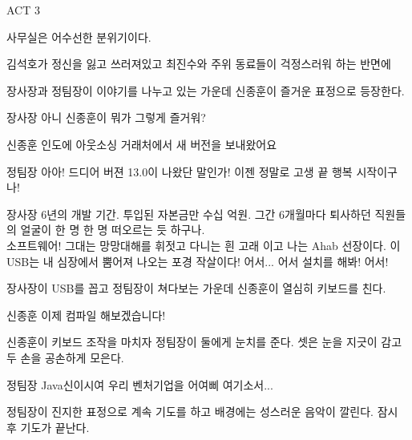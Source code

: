 \documentclass{screenplay}
\begin{document}
    \pagebreak
    
    ACT 3
    
    \fadein
    
    사무실은 어수선한 분위기이다.
    
    
    김석호가 정신을 잃고 쓰러져있고 최진수와 주위 동료들이 걱정스러워 하는 반면에 
    
    
    장사장과 정팀장이 이야기를 나누고 있는 가운데 신종훈이 즐거운 표정으로 등장한다.
    
    \begin{dialogue}{장사장}
        아니 신종훈이 뭐가 그렇게 즐거워?
    \end{dialogue}
    \begin{dialogue}{신종훈}
        인도에 아웃소싱 거래처에서 새 버전을 보내왔어요
    \end{dialogue}
    \begin{dialogue}[반가워하며]{정팀장}
        아아! 드디어 버젼 13.0이 나왔단 말인가! 이젠 정말로 고생 끝 행복 시작이구나!  
    \end{dialogue}
    \begin{dialogue}{장사장}
        6년의 개발 기간. 투입된 자본금만 수십 억원. 그간 6개월마다 퇴사하던 직원들의 얼굴이 한 명 한 명 떠오르는 듯 하구나.\\
        소프트웨어! 그대는 망망대해를 휘젓고 다니는 흰 고래 이고 나는 Ahab 선장이다.
        이 USB는 내 심장에서 뿜어져 나오는 포경 작살이다! 어서... 어서 설치를 해봐! 어서!
    \end{dialogue}
    장사장이 USB를 꼽고 정팀장이 쳐다보는 가운데 신종훈이 열심히 키보드를 친다.
    \begin{dialogue}{신종훈}
        이제 컴파일 해보겠습니다!
    \end{dialogue}
    신종훈이 키보드 조작을 마치자 정팀장이 둘에게 눈치를 준다. 셋은 눈을 지긋이 감고 두 손을 공손하게 모은다.
    \begin{dialogue}[기도하듯]{정팀장}
        Java신이시여 우리 벤처기업을 어여삐 여기소서...
    \end{dialogue}
    
    정팀장이 진지한 표정으로 계속 기도를 하고 배경에는 성스러운 음악이 깔린다. 잠시 후 기도가 끝난다.
    
\end{document}
